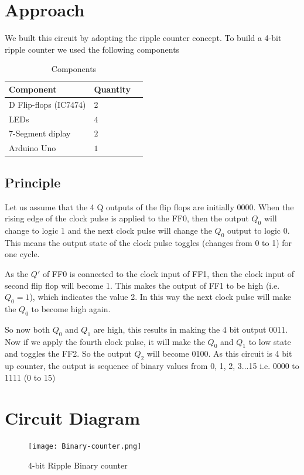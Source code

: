 \documentclass[twoside,twocolumn]{article}
\begin{document}
\section{Approach}
We built this circuit by adopting the ripple counter concept. To build a 4-bit ripple counter we used the following components   
\begin{table}[htp]
\caption{Components}
\centering
\begin{tabular}{llr}
\toprule
Component & Quantity \\
\midrule
D Flip-flops (IC7474) & 2\\
LEDs & $4$ \\
7-Segment diplay & $2$ \\
Arduino Uno & $1$ \\
\bottomrule
\end{tabular}
\end{table}



\subsection{Principle}
Let us assume that the 4 Q outputs of the flip flops are initially 0000. When the rising edge of the clock pulse is applied to the FF0, then the output $Q_{0}$ will change to logic 1 and the next clock pulse will change the $Q_{0}$ output to logic 0. This means the output state of the clock pulse toggles (changes from 0 to 1) for one cycle.

As the $Q'$ of FF0 is connected to the clock input of FF1, then the clock input of second flip flop will become 1. This makes the output of FF1 to be high (i.e. $Q_{0} = 1$), which indicates the value 2. In this way the next clock pulse will make the $Q_{0}$ to become high again.

So now both $Q_{0}$ and $Q_{1}$ are high, this results in making the 4 bit output 0011. Now if we apply the fourth clock pulse, it will make the $Q_{0}$ and $Q_{1}$ to low state and toggles the FF2. So the output $Q_{2}$ will become 0100. As this circuit is 4 bit up counter, the output is sequence of binary values from 0, 1, 2, 3...15 i.e. 0000 to 1111 (0 to 15)

\section{Circuit Diagram}
\begin{figure}[!h]
	\caption{4-bit Ripple Binary counter}
	\texttt{[image: Binary-counter.png]}
\end{figure}
\end{document}
